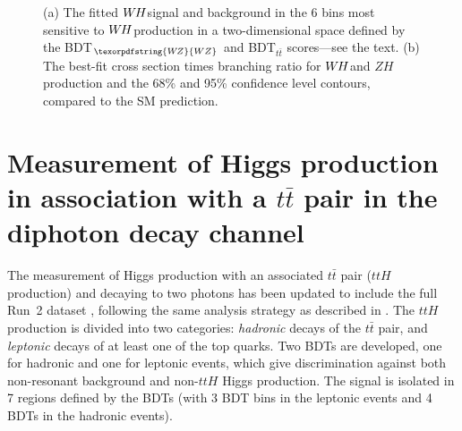\documentclass{moriond}
\def\wh{\texorpdfstring{\ensuremath{W\kern -0.1em H}\xspace}{WH\xspace}}
\def\wz{\texorpdfstring{\ensuremath{W\kern -0.1em Z}\xspace}{WZ\xspace}}
\def\zh{\ensuremath{ZH}\xspace}
\begin{document}
\begin{figure}[!htbp]
  \centering
  \caption{
    (a) The fitted \wh signal and background in the 6 bins most sensitive to \wh production in a
    two-dimensional space defined by the BDT$_{\wz}$ and BDT$_{t\bar t}$ scores---see the text.
    (b) The best-fit cross section times branching ratio for \wh and \zh production and the 68\% and
    95\% confidence level contours, compared to the SM prediction.
  }
  \label{fig:ww_vh}
\end{figure}

\section{Measurement of Higgs production in association with a $t\bar t$ pair in the diphoton decay channel}\label{sec:ttH_yy}

The measurement of Higgs production with an associated $t\bar t$ pair ($ttH$ production) and decaying
to two photons has been updated to include the full Run~2 dataset \cite{ATLAS-CONF-2019-004},
following the same analysis strategy as described in \cite{Aaboud:2018urx}. The $ttH$ production is
divided into two categories: {\itshape hadronic} decays of the $t\bar t$ pair, and
{\itshape leptonic} decays of at least one of the top quarks. Two BDTs are developed, one
for hadronic and one for leptonic events, which give discrimination against both non-resonant
background and non-$ttH$ Higgs production. The signal is isolated in 7 regions defined by the BDTs
(with 3 BDT bins in the leptonic events and 4 BDTs in the hadronic events).
\end{document}
